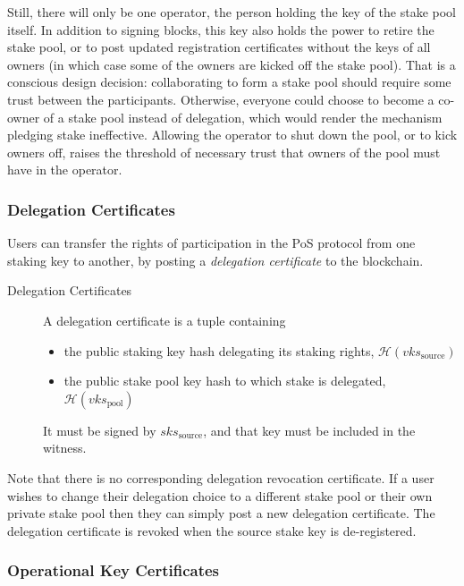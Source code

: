\documentclass[11pt,a4paper]{article}
\begin{document}
Still, there will only be one operator, the person holding the key of
the stake pool itself. In addition to signing blocks, this key also
holds the power to retire the stake pool, or to post updated
registration certificates without the keys of all owners (in which
case some of the owners are kicked off the stake pool). That is a
conscious design decision: collaborating to form a stake pool should
require some trust between the participants. Otherwise, everyone could
choose to become a co-owner of a stake pool instead of delegation,
which would render the mechanism pledging stake ineffective. Allowing the
operator to shut down the pool, or to kick owners off, raises the
threshold of necessary trust that owners of the pool must have in the
operator.

\subsubsection{Delegation Certificates}
\label{delegation-certificates}

Users can transfer the rights of participation in the PoS protocol from
one staking key to another, by posting a \emph{delegation
certificate} to the blockchain.

\begin{description}
\item[Delegation Certificates]
A delegation certificate is a tuple containing

\begin{itemize}
\item
  the public staking key hash delegating its staking rights,
  \(\mathcal{H}(vks_\text{source})\)
\item
  the public stake pool key hash to which stake is delegated,
  \(\mathcal{H}(vks_\text{pool})\) 
\end{itemize}

It must be signed by \(sks_\text{source}\), and that key must be
included in the witness.
\end{description}

Note that there is no corresponding delegation revocation certificate.
If a user wishes to change their delegation choice to a different stake
pool or their own private stake pool then they can simply post a new
delegation certificate. The delegation certificate is revoked when the
source stake key is de-registered.

\subsubsection{Operational Key Certificates}
\label{operational-key-certificates}
\end{document}
